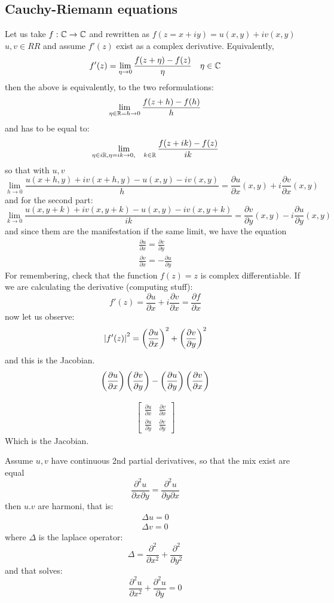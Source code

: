 \subsection*{Cauchy-Riemann equations}
Let us take $ f : \mathbb{C} \rightarrow \mathbb{C} $ and rewritten as $ f(z= x + iy) = u(x,y) + i v(x,y) $ $ u,v \in RR$  and assume $f'(z)$ exist as a complex derivative. Equivalently,
\[ f'(z) = \lim\limits_{\eta \rightarrow 0}  \frac{f(z + \eta) - f(z)}{\eta} \quad \eta \in \mathbb{C}\]
then the above is equivalently, to the two reformulations:
\[ \lim_{\eta \in \mathbb{R} = h \rightarrow 0} \frac{f(z+h) - f(h)}{h} \]
and has to be equal to:
\[ \lim\limits_{\eta \in i\mathbb{R}, \eta = ik \rightarrow 0, \quad k \in \mathbb{R}}  \frac{f(z+ik) - f(z)}{ik}\]
so that with $u, v$
\[ \lim\limits_{h \rightarrow 0} \frac{u(x + h,y) + iv(x+h,y) - u(x,y)-iv(x,y)}{h} = \frac{\partial u}{\partial x}(x,y) + i \frac{\partial v}{\partial x} (x,y)\]
 and for the second part:
 \[ \lim\limits_{k \rightarrow 0 } \frac{u(x, y+k) + iv(x,y+k) - u(x,y) - iv(x,y+k)}{ik} = \frac{\partial v}{\partial y}(x,y) - i \frac{\partial u}{\partial y}(x,y)\]
 and since them are the manifestation if the same limit, we have the equation
 \begin{align*}
 \frac{ \partial u}{\partial x} = \frac{ \partial v}{\partial y} \\
 \frac{\partial v}{\partial x} = - \frac{ \partial u}{\partial y}
 \end{align*}
 For remembering, check that the function $ f(z) = z$ is complex differentiable. 
 If we are calculating the derivative (computing stuff):
 \[ f'(z) = \frac{\partial u}{\partial x} + i \frac{\partial v}{\partial x} = \frac{\partial f}{\partial x} \]
 now let us observe:
 \[ \left| f'(z) \right|^2 = \left( \frac{\partial u}{\partial x} \right)^2 + \left(  \frac{\partial v}{\partial y} \right)^2 \]
 and this is the Jacobian. 
 \[ \left( \frac{\partial u}{\partial x} \right) \left( \frac{\partial v}{\partial y} \right) - \left(  \frac{\partial u}{\partial y} \right) \left( \frac{\partial v}{\partial x} \right) \]
 
 \begin{align*}
 \begin{bmatrix}
 \frac{\partial u}{\partial x} & \frac{\partial v}{\partial x} \\
 \frac{\partial u}{\partial y} & \frac{\partial v}{\partial y}
 \end{bmatrix}
 \end{align*}
 Which is the Jacobian.
   
 Assume $u,v$ have continuous 2nd partial derivatives, so that the mix exist are equal 
 \[ \frac{ \partial^2 u}{\partial x \partial y} = \frac{\partial^2 u}{\partial y \partial x} \]
 then $u.v$ are harmoni, that is:
 \begin{align*}
 \Delta u = 0 \\
 \Delta v = 0
 \end{align*}
 where $\Delta$ is the laplace operator:
 \[ \Delta= \frac{\partial^2 }{\partial x^2} + \frac{\partial^2}{\partial y^2} \]
 and that solves:
 \[ \frac{\partial^2 u}{\partial x^2} + \frac{\partial^2 u}{\partial y} = 0 \]
 